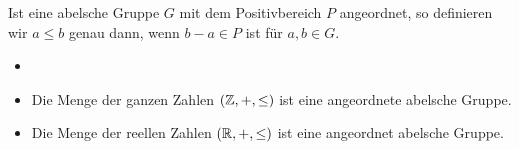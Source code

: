 \begin{bem}\label{angeordnetAbelsch} %
Ist eine abelsche Gruppe $G$ mit dem Positivbereich $P$ angeordnet, so definieren wir $a \leq b$ genau dann, wenn $b - a \in P$ ist für $a, b \in G$.
\end{bem}
%
%
%
%
%
\begin{bsp}
\begin{itemize}
\item[]
\item Die Menge der ganzen Zahlen $\left(\mathbb{Z}, +, \leq\right)$ ist eine angeordnete abelsche Gruppe.
\item Die Menge der reellen Zahlen $\left(\mathbb{R}, +, \leq\right)$ ist eine angeordnet abelsche Gruppe.
\end{itemize} 
\end{bsp}
                                                                                                                     
%

